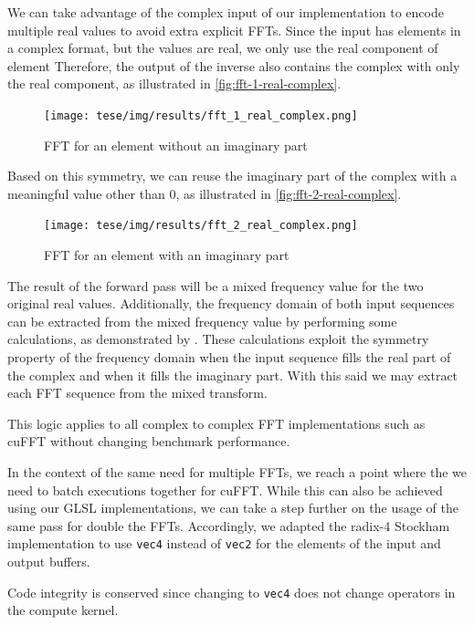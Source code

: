\documentclass[
  oneside,
  11pt, a4paper,
  footinclude=true,
  headinclude=true,
  cleardoublepage=empty
]{scrbook}
\begin{document}
We can take advantage of the complex input of our implementation to encode multiple real values to avoid extra explicit FFTs. Since the input has elements in a complex format, but the values are real, we only use the real component of element Therefore, the output of the inverse also contains the complex with only the real component, as illustrated in \autoref{fig:fft-1-real-complex}.

\begin{figure}[H] 
    \centering
    \texttt{[image: tese/img/results/fft\_1\_real\_complex.png]}
    \caption{FFT for an element without an imaginary part}
    \label{fig:fft-1-real-complex}
\end{figure}


Based on this symmetry, we can reuse the imaginary part of the complex with a meaningful value other than $0$, as illustrated in \autoref{fig:fft-2-real-complex}.

\begin{figure}[H] 
    \centering
    \texttt{[image: tese/img/results/fft\_2\_real\_complex.png]}
    \caption{FFT for an element with an imaginary part}
    \label{fig:fft-2-real-complex}
\end{figure}

The result of the forward pass will be a mixed frequency value for the two original real values. Additionally, the frequency domain of both input sequences can be extracted from the mixed frequency value by performing some calculations, as demonstrated by \cite{tworealsignalsfft}. These calculations exploit the symmetry property of the frequency domain when the input sequence fills the real part of the complex and when it fills the imaginary part. With this said we may extract each FFT sequence from the mixed transform.

This logic applies to all complex to complex FFT implementations such as cuFFT without changing benchmark performance.
\newline

In the context of the same need for multiple FFTs, we reach a point where the we need to batch executions together for cuFFT. While this can also be achieved using our GLSL implementations, we can take a step further on the usage of the same pass for double the FFTs. Accordingly, we adapted the radix-4 Stockham implementation to use \texttt{vec4} instead of \texttt{vec2} for the elements of the input and output buffers.

Code integrity is conserved since changing to \texttt{vec4} does not change operators in the compute kernel. 
\end{document}
